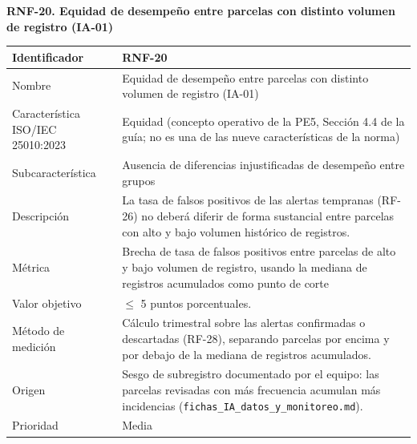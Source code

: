 \documentclass[12pt,a4paper]{article}
\begin{document}
\begin{minipage}{\linewidth}
\bigskip
\noindent\textbf{RNF-20. Equidad de desempeño entre parcelas con distinto volumen de registro (IA-01)}
\label{tab:RNF-20}

\begin{center}
\begin{tabular}{|p{4.2cm}|p{10cm}|}
\hline
Identificador & RNF-20 \\
\hline
Nombre & Equidad de desempeño entre parcelas con distinto volumen de registro (IA-01) \\
\hline
Característica ISO/IEC 25010:2023 & Equidad (concepto operativo de la PE5, Sección 4.4 de la guía; no es una de las nueve características de la norma) \\
\hline
Subcaracterística & Ausencia de diferencias injustificadas de desempeño entre grupos \\
\hline
Descripción & La tasa de falsos positivos de las alertas tempranas (RF-26) no deberá diferir de forma sustancial entre parcelas con alto y bajo volumen histórico de registros. \\
\hline
Métrica & Brecha de tasa de falsos positivos entre parcelas de alto y bajo volumen de registro, usando la mediana de registros acumulados como punto de corte \\
\hline
Valor objetivo & $\leq$ 5 puntos porcentuales. \\
\hline
Método de medición & Cálculo trimestral sobre las alertas confirmadas o descartadas (RF-28), separando parcelas por encima y por debajo de la mediana de registros acumulados. \\
\hline
Origen & Sesgo de subregistro documentado por el equipo: las parcelas revisadas con más frecuencia acumulan más incidencias (\texttt{fichas\_IA\_datos\_y\_monitoreo.md}). \\
\hline
Prioridad & Media \\
\hline
\end{tabular}
\end{center}
\end{minipage}
\end{document}
